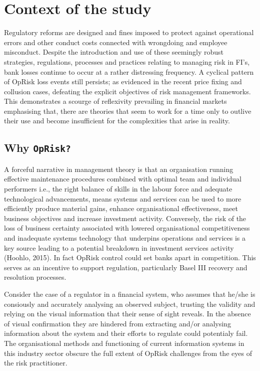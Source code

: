 \documentclass{DissertateUSU}
\begin{document}
\section{Context of the study}
\label{sec:Context of the study}

Regulatory reforms are designed and fines imposed to protect against
operational errors and other conduct costs connected with wrongdoing and
employee misconduct. Despite the introduction and use of these seemingly
robust strategies, regulations, processes and practices relating to
managing risk in FI's, bank losses continue to occur at a rather
distressing frequency. A cyclical pattern of OpRisk loss events still
persists; as evidenced in the recent price fixing and collusion cases,
defeating the explicit objectives of risk management frameworks. This
demonstrates a scourge of reflexivity prevailing in financial markets
emphasising that, there are theories that seem to work for a time only
to outlive their use and become insufficient for the complexities that
arise in reality.\medskip 

\subsection{Why \texttt{OpRisk?}}

A forceful narrative in management theory is that an organisation
running effective maintenance procedures combined with optimal team and
individual performers i.e., the right balance of skills in the labour
force and adequate technological advancements, means systems and
services can be used to more efficiently produce material gains, enhance
organisational effectiveness, meet business objectives and increase
investment activity. Conversely, the risk of the loss of business
certainty associated with lowered organisational competitiveness and
inadequate systems technology that underpins operations and services is
a key source leading to a potential breakdown in investment services
activity (Hoohlo, 2015). In fact OpRisk control could set banks apart in
competition. This serves as an incentive to support regulation,
particularly Basel III recovery and resolution processes.\medskip

Consider the case of a regulator in a financial system, who assumes that
he/she is consiously and accurately analysing an observed subject,
trusting the validity and relying on the visual information that their
sense of sight reveals. In the absence of visual confirmation they are
hindered from extracting and/or analysing information about the system
and their efforts to regulate could potentialy fail. The organisational
methods and functioning of current information systems in this industry
sector obscure the full extent of OpRisk challenges from the eyes of the
risk practitioner.\medskip 
\end{document}
